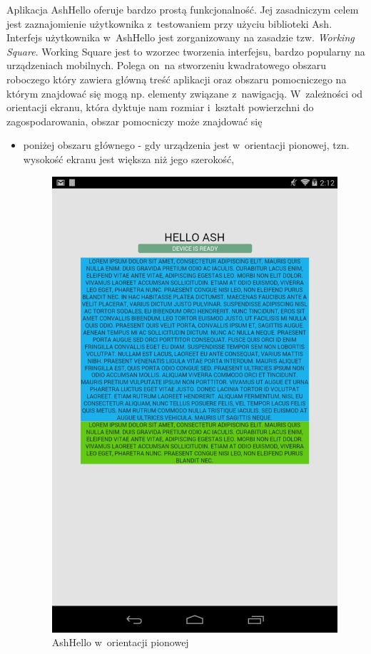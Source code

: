 \documentclass[brudnopis]{xmgr}
\begin{document}
Aplikacja AshHello oferuje bardzo prostą funkcjonalność. Jej zasadniczym celem jest zaznajomienie użytkownika z~testowaniem przy użyciu biblioteki Ash. Interfejs użytkownika w~AshHello jest zorganizowany na zasadzie tzw. {\it Working Square}. Working Square jest to wzorzec tworzenia interfejsu, bardzo popularny na urządzeniach mobilnych. Polega on~na stworzeniu kwadratowego obszaru roboczego który zawiera główną treść aplikacji oraz obszaru pomocniczego na którym znajdować się mogą np. elementy związane z~nawigacją. W~zależności od orientacji ekranu, która dyktuje nam rozmiar i~kształt powierzchni do zagospodarowania, obszar pomocniczy może znajdować się 

\begin{itemize}
  \item poniżej obszaru głównego - gdy urządzenia jest w~orientacji pionowej, tzn. wysokość ekranu jest większa niż jego szerokość,

\begin{figure}[h]
    \centering
    \includegraphics[scale=0.25]{hello1.png}
    \caption{AshHello w~orientacji pionowej}
    \label{fig:AshHello1}
\end{figure}


\end{itemize}
\end{document}

